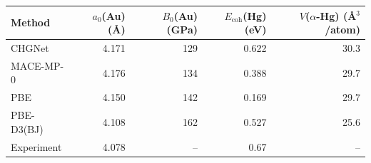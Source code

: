 \begin{tabular}{lrrrr}
\toprule
Method & $a_0$(Au) (\AA) & $B_0$(Au) (GPa) & $E_\mathrm{coh}$(Hg) (eV) & $V$($\alpha$-Hg) (\AA$^3$/atom)\\
\midrule
CHGNet & 4.171 & 129 & 0.622 & 30.3\\
MACE-MP-0 & 4.176 & 134 & 0.388 & 29.7\\
PBE & 4.150 & 142 & 0.169 & 29.7\\
PBE-D3(BJ) & 4.108 & 162 & 0.527 & 25.6\\
\midrule
Experiment & 4.078 & -- & 0.67 & --\\
\bottomrule
\end{tabular}
